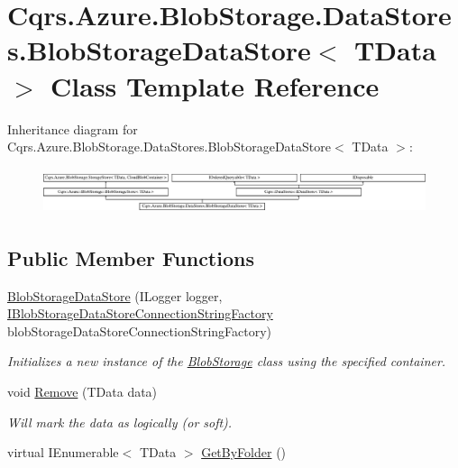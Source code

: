 \hypertarget{classCqrs_1_1Azure_1_1BlobStorage_1_1DataStores_1_1BlobStorageDataStore}{}\section{Cqrs.\+Azure.\+Blob\+Storage.\+Data\+Stores.\+Blob\+Storage\+Data\+Store$<$ T\+Data $>$ Class Template Reference}
\label{classCqrs_1_1Azure_1_1BlobStorage_1_1DataStores_1_1BlobStorageDataStore}
Inheritance diagram for Cqrs.\+Azure.\+Blob\+Storage.\+Data\+Stores.\+Blob\+Storage\+Data\+Store$<$ T\+Data $>$\+:\begin{figure}[H]
\begin{center}
\leavevmode
\includegraphics[height=1.352657cm]{classCqrs_1_1Azure_1_1BlobStorage_1_1DataStores_1_1BlobStorageDataStore}
\end{center}
\end{figure}
\subsection*{Public Member Functions}
\begin{DoxyCompactItemize}
\item 
\hyperlink{classCqrs_1_1Azure_1_1BlobStorage_1_1DataStores_1_1BlobStorageDataStore_aacea885f6a1d38921b99feb898fc33c2}{Blob\+Storage\+Data\+Store} (I\+Logger logger, \hyperlink{interfaceCqrs_1_1Azure_1_1BlobStorage_1_1DataStores_1_1IBlobStorageDataStoreConnectionStringFactory}{I\+Blob\+Storage\+Data\+Store\+Connection\+String\+Factory} blob\+Storage\+Data\+Store\+Connection\+String\+Factory)
\begin{DoxyCompactList}\small\item\em Initializes a new instance of the \hyperlink{namespaceCqrs_1_1Azure_1_1BlobStorage}{Blob\+Storage} class using the specified container. \end{DoxyCompactList}\item 
void \hyperlink{classCqrs_1_1Azure_1_1BlobStorage_1_1DataStores_1_1BlobStorageDataStore_af054d4134671d66981c4d91df5c1d481}{Remove} (T\+Data data)
\begin{DoxyCompactList}\small\item\em Will mark the {\itshape data}  as logically (or soft). \end{DoxyCompactList}\item 
virtual I\+Enumerable$<$ T\+Data $>$ \hyperlink{classCqrs_1_1Azure_1_1BlobStorage_1_1DataStores_1_1BlobStorageDataStore_a611a374a549ef987d0ff59bd84ea1a4b}{Get\+By\+Folder} ()
\end{DoxyCompactItemize}
